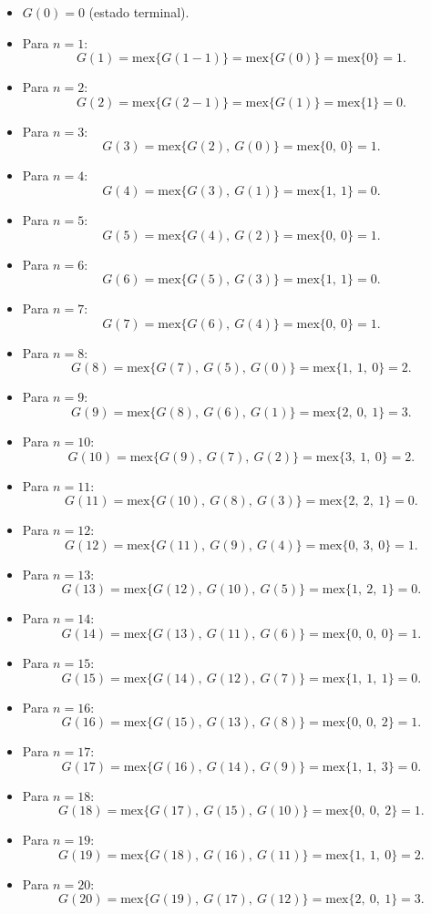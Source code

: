 \documentclass[11pt]{scrartcl}
\begin{document}
\begin{problem}
\begin{hint}
\begin{solu}
\begin{itemize}
\item $G(0) = 0$ (estado terminal).
\item Para $n = 1$:
  \[
  G(1) = \text{mex}\{ G(1 - 1) \} = \text{mex}\{ G(0) \} = \text{mex}\{ 0 \} = 1.
  \]
\item Para $n = 2$:
  \[
  G(2) = \text{mex}\{ G(2 - 1) \} = \text{mex}\{ G(1) \} = \text{mex}\{ 1 \} = 0.
  \]
\item Para $n = 3$:
  \[
  G(3) = \text{mex}\{ G(2),\ G(0) \} = \text{mex}\{ 0,\ 0 \} = 1.
  \]
\item Para $n = 4$:
  \[
  G(4) = \text{mex}\{ G(3),\ G(1) \} = \text{mex}\{ 1,\ 1 \} = 0.
  \]
\item Para $n = 5$:
  \[
  G(5) = \text{mex}\{ G(4),\ G(2) \} = \text{mex}\{ 0,\ 0 \} = 1.
  \]
\item Para $n = 6$:
  \[
  G(6) = \text{mex}\{ G(5),\ G(3) \} = \text{mex}\{ 1,\ 1 \} = 0.
  \]
\item Para $n = 7$:
  \[
  G(7) = \text{mex}\{ G(6),\ G(4) \} = \text{mex}\{ 0,\ 0 \} = 1.
  \]
\item Para $n = 8$:
  \[
  G(8) = \text{mex}\{ G(7),\ G(5),\ G(0) \} = \text{mex}\{ 1,\ 1,\ 0 \} = 2.
  \]
\item Para $n = 9$:
  \[
  G(9) = \text{mex}\{ G(8),\ G(6),\ G(1) \} = \text{mex}\{ 2,\ 0,\ 1 \} = 3.
  \]
\item Para $n = 10$:
  \[
  G(10) = \text{mex}\{ G(9),\ G(7),\ G(2) \} = \text{mex}\{ 3,\ 1,\ 0 \} = 2.
  \]
\item Para $n = 11$:
  \[
  G(11) = \text{mex}\{ G(10),\ G(8),\ G(3) \} = \text{mex}\{ 2,\ 2,\ 1 \} = 0.
  \]
\item Para $n = 12$:
  \[
  G(12) = \text{mex}\{ G(11),\ G(9),\ G(4) \} = \text{mex}\{ 0,\ 3,\ 0 \} = 1.
  \]
\item Para $n = 13$:
  \[
  G(13) = \text{mex}\{ G(12),\ G(10),\ G(5) \} = \text{mex}\{ 1,\ 2,\ 1 \} = 0.
  \]
\item Para $n = 14$:
  \[
  G(14) = \text{mex}\{ G(13),\ G(11),\ G(6) \} = \text{mex}\{ 0,\ 0,\ 0 \} = 1.
  \]
\item Para $n = 15$:
  \[
  G(15) = \text{mex}\{ G(14),\ G(12),\ G(7) \} = \text{mex}\{ 1,\ 1,\ 1 \} = 0.
  \]
\item Para $n = 16$:
  \[
  G(16) = \text{mex}\{ G(15),\ G(13),\ G(8) \} = \text{mex}\{ 0,\ 0,\ 2 \} = 1.
  \]
\item Para $n = 17$:
  \[
  G(17) = \text{mex}\{ G(16),\ G(14),\ G(9) \} = \text{mex}\{ 1,\ 1,\ 3 \} = 0.
  \]
\item Para $n = 18$:
  \[
  G(18) = \text{mex}\{ G(17),\ G(15),\ G(10) \} = \text{mex}\{ 0,\ 0,\ 2 \} = 1.
  \]
\item Para $n = 19$:
  \[
  G(19) = \text{mex}\{ G(18),\ G(16),\ G(11) \} = \text{mex}\{ 1,\ 1,\ 0 \} = 2.
  \]
\item Para $n = 20$:
  \[
  G(20) = \text{mex}\{ G(19),\ G(17),\ G(12) \} = \text{mex}\{ 2,\ 0,\ 1 \} = 3.
  \]
\end{itemize}


\end{solu}
\end{hint}
\end{problem}
\end{document}
